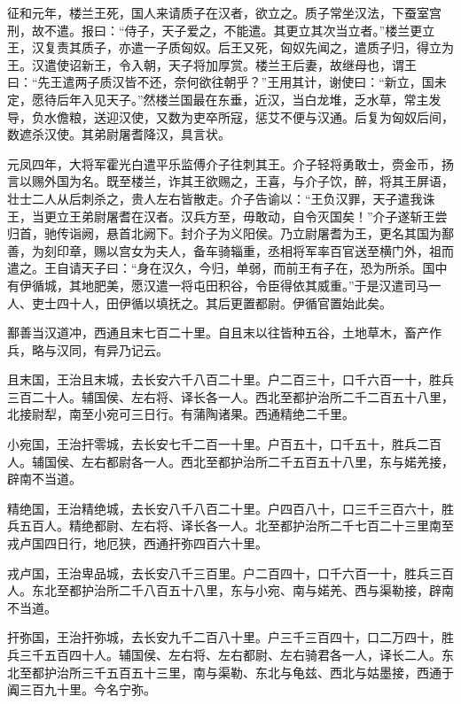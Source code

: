 \documentclass[12pt,UTF8]{ctexbook}
\begin{document}
征和元年，楼兰王死，国人来请质子在汉者，欲立之。质子常坐汉法，下蚕室宫刑，故不遣。报曰：“侍子，天子爱之，不能遣。其更立其次当立者。”楼兰更立王，汉复责其质子，亦遣一子质匈奴。后王又死，匈奴先闻之，遣质子归，得立为王。汉遣使诏新王，令入朝，天子将加厚赏。楼兰王后妻，故继母也，谓王曰：“先王遣两子质汉皆不还，奈何欲往朝乎？”王用其计，谢使曰：“新立，国未定，愿待后年入见天子。”然楼兰国最在东垂，近汉，当白龙堆，乏水草，常主发导，负水儋粮，送迎汉使，又数为吏卒所寇，惩艾不便与汉通。后复为匈奴后间，数遮杀汉使。其弟尉屠耆降汉，具言状。



元凤四年，大将军霍光白遣平乐监傅介子往刺其王。介子轻将勇敢士，赍金币，扬言以赐外国为名。既至楼兰，诈其王欲赐之，王喜，与介子饮，醉，将其王屏语，壮士二人从后刺杀之，贵人左右皆散走。介子告谕以：“王负汉罪，天子遣我诛王，当更立王弟尉屠耆在汉者。汉兵方至，毋敢动，自令灭国矣！”介子遂斩王尝归首，驰传诣阙，悬首北阙下。封介子为义阳侯。乃立尉屠耆为王，更名其国为鄯善，为刻印章，赐以宫女为夫人，备车骑辎重，丞相将军率百官送至横门外，祖而遣之。王自请天子曰：“身在汉久，今归，单弱，而前王有子在，恐为所杀。国中有伊循城，其地肥美，愿汉遣一将屯田积谷，令臣得依其威重。”于是汉遣司马一人、吏士四十人，田伊循以填抚之。其后更置都尉。伊循官置始此矣。



鄯善当汉道冲，西通且末七百二十里。自且末以往皆种五谷，土地草木，畜产作兵，略与汉同，有异乃记云。



且末国，王治且末城，去长安六千八百二十里。户二百三十，口千六百一十，胜兵三百二十人。辅国侯、左右将、译长各一人。西北至都护治所二千二百五十八里，北接尉犁，南至小宛可三日行。有蒲陶诸果。西通精绝二千里。



小宛国，王治扞零城，去长安七千二百一十里。户百五十，口千五十，胜兵二百人。辅国侯、左右都尉各一人。西北至都护治所二千五百五十八里，东与婼羌接，辟南不当道。



精绝国，王治精绝城，去长安八千八百二十里。户四百八十，口三千三百六十，胜兵五百人。精绝都尉、左右将、译长各一人。北至都护治所二千七百二十三里南至戎卢国四日行，地厄狭，西通扞弥四百六十里。



戎卢国，王治卑品城，去长安八千三百里。户二百四十，口千六百一十，胜兵三百人。东北至都护治所二千八百五十八里，东与小宛、南与婼羌、西与渠勒接，辟南不当道。



扞弥国，王治扞弥城，去长安九千二百八十里。户三千三百四十，口二万四十，胜兵三千五百四十人。辅国侯、左右将、左右都尉、左右骑君各一人，译长二人。东北至都护治所三千五百五十三里，南与渠勒、东北与龟兹、西北与姑墨接，西通于阗三百九十里。今名宁弥。
\end{document}
